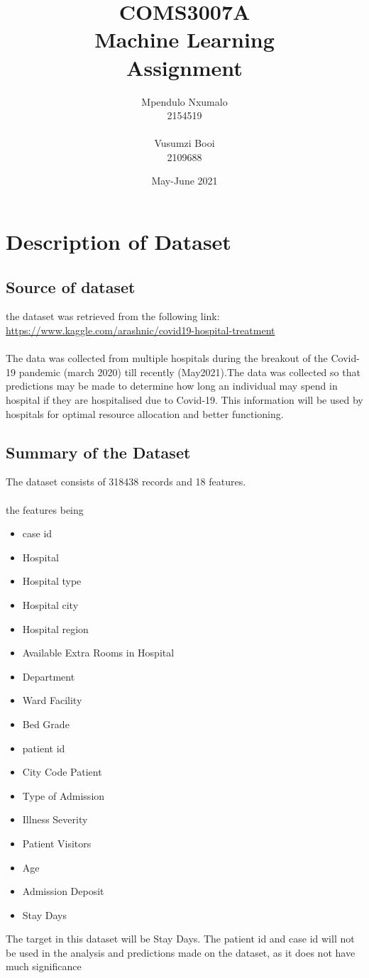 \documentclass[fleqn]{article}
\title{COMS3007A\\Machine Learning\\Assignment}
\author{Mpendulo Nxumalo\\ 2154519\\ \\Vusumzi Booi\\2109688}
\date{May-June 2021}
\begin{document}
	\maketitle
	\newpage
	
	\section*{Description of Dataset}
	
		\subsection*{Source of dataset}
			
			the dataset was retrieved from the following link: \\
			\url{https://www.kaggle.com/arashnic/covid19-hospital-treatment}\\
			\\The data was collected from multiple hospitals during the breakout of 	the Covid-19 pandemic (march 2020) till recently (May2021).The data was collected 	so that predictions may be made to determine how long an individual may spend in hospital if they are hospitalised due to Covid-19. This information will be used by hospitals for optimal resource allocation and better functioning.
			
			
			
		\subsection*{Summary of the Dataset}
			 The dataset consists of 318438 records and 18 features. \\
			 \\ the features being \\
			 \begin{itemize}
			 	\item case id 
			 	\item Hospital
			 	\item Hospital type
			 	\item Hospital city
			 	\item Hospital region
			 	\item Available Extra Rooms in Hospital
			 	\item Department
			 	\item Ward Facility
			 	\item Bed Grade
			 	\item patient id
			 	\item City Code Patient
			 	\item Type of Admission
			 	\item Illness Severity
			 	\item Patient Visitors
			 	\item Age
			 	\item Admission Deposit
			 	\item Stay Days
			 \end{itemize} 		 
			The target in this dataset will be Stay Days. The patient id and case id will not be used in the analysis and predictions made on the dataset, as it does not have much significance 
			
\end{document}
